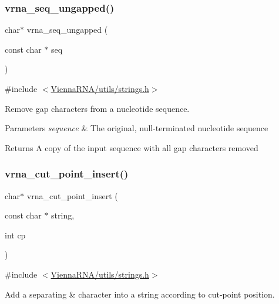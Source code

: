 \subsubsection{\texorpdfstring{vrna\_seq\_ungapped()}{vrna\_seq\_ungapped()}}
{\footnotesize\ttfamily char$\ast$ vrna\+\_\+seq\+\_\+ungapped (\begin{DoxyParamCaption}\item[{const char $\ast$}]{seq }\end{DoxyParamCaption})}



{\ttfamily \#include $<$\mbox{\hyperlink{strings_8h}{Vienna\+R\+N\+A/utils/strings.\+h}}$>$}



Remove gap characters from a nucleotide sequence. 


\begin{DoxyParams}{Parameters}
{\em sequence} & The original, null-\/terminated nucleotide sequence \\
\hline
\end{DoxyParams}
\begin{DoxyReturn}{Returns}
A copy of the input sequence with all gap characters removed 
\end{DoxyReturn}
\mbox{\label{group__string__utils_ga74f05ece32ea73b59f84a7452afd5fae}} 
\subsubsection{\texorpdfstring{vrna\_cut\_point\_insert()}{vrna\_cut\_point\_insert()}}
{\footnotesize\ttfamily char$\ast$ vrna\+\_\+cut\+\_\+point\+\_\+insert (\begin{DoxyParamCaption}\item[{const char $\ast$}]{string,  }\item[{int}]{cp }\end{DoxyParamCaption})}



{\ttfamily \#include $<$\mbox{\hyperlink{strings_8h}{Vienna\+R\+N\+A/utils/strings.\+h}}$>$}



Add a separating \textquotesingle{}\&\textquotesingle{} character into a string according to cut-\/point position. 

